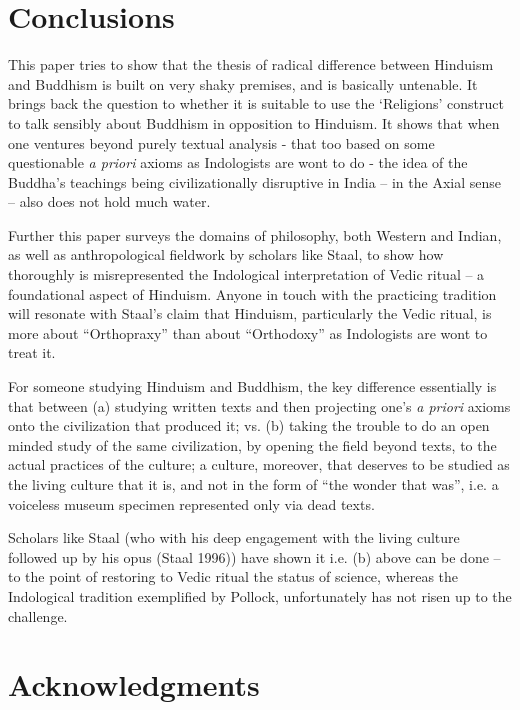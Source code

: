 \vspace{-.3cm}

\section*{Conclusions}

This paper tries to show that the thesis of radical difference between Hinduism and Buddhism is built on very shaky premises, and is basically untenable. It brings back the question to whether it is suitable to use the ‘Religions’ construct to talk sensibly about Buddhism in opposition to Hinduism. It shows that when one ventures beyond purely textual analysis - that too based on some questionable \textit{a priori} axioms as Indologists are wont to do - the idea of the Buddha’s teachings being civilizationally disruptive in India – in the Axial sense – also does not hold much water.

Further this paper surveys the domains of philosophy, both Western and Indian, as well as anthropological fieldwork by scholars like Staal, to show how thoroughly is misrepresented the Indological interpretation of Vedic ritual – a foundational aspect of Hinduism. Anyone in touch with the practicing tradition will resonate with Staal’s claim that Hinduism, particularly the Vedic ritual, is more about “Orthopraxy” than about “Orthodoxy” as Indologists are wont to treat it.

For someone studying Hinduism and Buddhism, the key difference essentially is that between (a) studying written texts and then projecting one’s \textit{a priori} axioms onto the civilization that produced it; vs. (b) taking the trouble to do an open minded study of the same civilization, by opening the field beyond texts, to the actual practices of the culture; a culture, moreover, that deserves to be studied as the living culture that it is, and not in the form of “the wonder that was”, i.e. a voiceless museum specimen represented only via dead texts.

Scholars like Staal (who with his deep engagement with the living culture followed up by his opus (Staal 1996)) have shown it i.e. (b) above can be done – to the point of restoring to Vedic ritual the status of science, whereas the Indological tradition exemplified by Pollock, unfortunately has not risen up to the challenge.


\section*{Acknowledgments}

